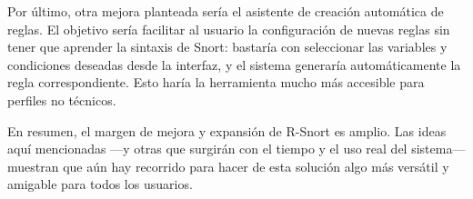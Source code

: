 \documentclass[11pt,a4paper,twoside]{report}
\begin{document}
Por último, otra mejora planteada sería el asistente de creación automática de reglas. El objetivo sería facilitar al usuario la configuración de nuevas reglas sin tener que aprender la sintaxis de Snort: bastaría con seleccionar las variables y condiciones deseadas desde la interfaz, y el sistema generaría automáticamente la regla correspondiente. Esto haría la herramienta mucho más accesible para perfiles no técnicos.\newline

En resumen, el margen de mejora y expansión de R-Snort es amplio. Las ideas aquí mencionadas —y otras que surgirán con el tiempo y el uso real del sistema— muestran que aún hay recorrido para hacer de esta solución algo más versátil y amigable para todos los usuarios.


\cleardoublepage %
\end{document}
